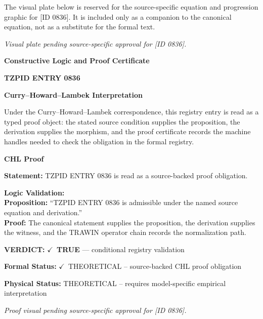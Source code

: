 \begingroup\footnotesize\sloppy
The visual plate below is reserved for the source-specific equation and progression graphic for [ID 0836]. It is included only as a companion to the canonical equation, not as a substitute for the formal text.
\par\endgroup
\begingroup\footnotesize\itshape
Visual plate pending source-specific approval for [ID 0836].
\par\endgroup

\clearpage
\begingroup\tzpsupportsetup
\noindent\textbf{\fontsize{10.8pt}{12.8pt}\selectfont [ID 0836] Constructive Logic and Proof Certificate}\par
\noindent\textbf{\fontsize{10pt}{12pt}\selectfont TZPID ENTRY 0836}\par
\vspace{0.45em}
\begingroup
\footnotesize
\setlength{\parskip}{0.22em}
\setlength{\parindent}{0pt}
\noindent\textbf{Curry--Howard--Lambek Interpretation}\par
Under the Curry--Howard--Lambek correspondence, this registry entry is read as a typed proof
object: the stated source condition supplies the proposition, the derivation supplies the
morphism, and the proof certificate records the machine handles needed to check the obligation
in the formal registry.

\vspace{0.45em}
\noindent\textbf{CHL Proof}\par
\textbf{Statement:} TZPID ENTRY 0836 is read as a source-backed proof obligation.

\textbf{Logic Validation:}\\
\textbf{Proposition:} ``TZPID ENTRY 0836 is admissible under the named source equation and derivation.''\\
\textbf{Proof:} The canonical statement supplies the proposition, the derivation supplies the witness, and the TRAWIN operator chain records the normalization path.

\textbf{VERDICT:} \ensuremath{\checkmark}\ \textbf{TRUE} --- conditional registry validation

\textbf{Formal Status:} \ensuremath{\checkmark}\ THEORETICAL -- source-backed CHL proof obligation

\textbf{Physical Status:} THEORETICAL -- requires model-specific empirical interpretation
\par\vspace{0.45em}
\par
\vfill
\begingroup\footnotesize\itshape
Proof visual pending source-specific approval for [ID 0836].
\par\endgroup
\vfill
\endgroup
\endgroup
